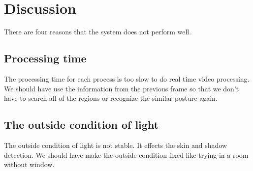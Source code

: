\section{Discussion}
There are four reasons that the system does not perform well.
\subsection{Processing time}
The processing time for each process is too slow to do real time video processing.
We should have use the information from the previous frame so that we don't have to search all of the regions or recognize the similar posture again.
\subsection{The outside condition of light}
The outside condition of light is not stable. It effects the skin and shadow detection.
We should have make the outside condition fixed like trying in a room without window.
